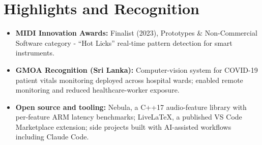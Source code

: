 \documentclass[11pt]{article}
\begin{document}
\enlargethispage{4\baselineskip}
\section*{Highlights and Recognition}
\begin{itemize}[leftmargin=1.2em, itemsep=-0.25em]
    \item \textbf{MIDI Innovation Awards:} Finalist (2023), Prototypes \& Non-Commercial Software category - ``Hot Licks'' real-time pattern detection for smart instruments.
    \item \textbf{GMOA Recognition (Sri Lanka):} Computer-vision system for COVID-19 patient vitals monitoring deployed across hospital wards; enabled remote monitoring and reduced healthcare-worker exposure.
    \item \textbf{Open source and tooling:} Nebula, a C++17 audio-feature library with per-feature ARM latency benchmarks; LiveLaTeX, a published VS Code Marketplace extension; side projects built with AI-assisted workflows including Claude Code.
\end{itemize}
\end{document}
